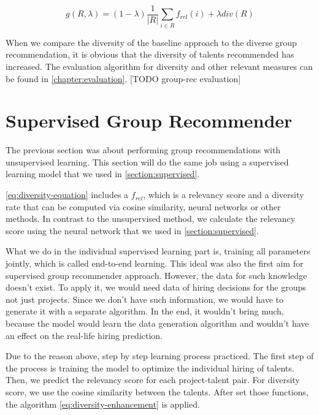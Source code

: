 \begin{equation}
g ( R , \lambda ) = ( 1 - \lambda ) \frac { 1 } { | R | } \sum _ { i \in R } f _ { r e l } ( i ) + \lambda d i v ( R )
\label{eq:diversity-equation}
\end{equation}

When we compare the diversity of the baseline approach to the diverse group recommendation, it is obvious that the diversity of talents recommended has increased. The evaluation algorithm for diversity and other relevant measures can be found in \autoref{chapter:evaluation}. [TODO group-rec evaluation]

\section{Supervised Group Recommender}\label{section:supervised-group-rec}

The previous section was about performing group recommendations with unsupervised learning. This section will do the same job using a supervised learning model that we used in \autoref{section:supervised}.


\autoref{eq:diversity-equation} includes a $f _ { rel } $, which is a relevancy score and a diversity rate that can be computed via cosine similarity, neural networks or other methods. In contrast to the unsupervised method, we calculate the relevancy score using the neural network that we used in \autoref{section:supervised}.

What we do in the individual supervised learning part is, training all parameters jointly, which is called end-to-end learning. This ideal was also the first aim for supervised group recommender approach. However, the data for such knowledge doesn't exist. To apply it, we would need data of hiring decisions for the groups not just projects. Since we don't have such information, we would have to generate it with a separate algorithm. In the end, it wouldn't bring much, because the model would learn the data generation algorithm and wouldn't have an effect on the real-life hiring prediction.


Due to the reason above, step by step learning process practiced. The first step of the process is training the model to optimize the individual hiring of talents. Then, we predict the relevancy score for each project-talent pair. For diversity score, we use the cosine similarity between the talents. After set those functions, the algorithm \ref{eq:diversity-enhancement} is applied.


